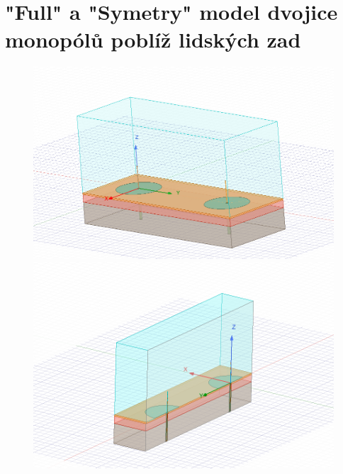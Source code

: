 \documentclass[10pt, a4paper]{article}%
\begin{document}
\section{\Large "Full"  a "Symetry" model dvojice monopólů poblíž lidských zad}
\begin{figure}[ht!]
	\centering
	\begin{minipage}{0.45\textwidth}
		\centering
		\includegraphics[width= 1\textwidth, height = 0.25\textheight]{dual_model.png}
	\end{minipage}%
	\hfill
	\begin{minipage}{0.45\textwidth}
		\centering
		\includegraphics[width= 1\textwidth,height = 0.25\textheight]{symetry_model.png}
	\end{minipage}
	\end{figure}
\end{document}
